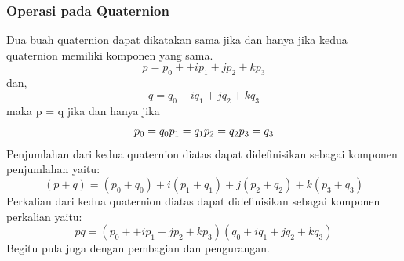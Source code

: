 \subsubsection{Operasi pada Quaternion}
Dua buah quaternion dapat dikatakan sama jika dan hanya jika kedua quaternion memiliki komponen yang sama.
\[
	p = p_0 + +ip_1+jp_2+kp_3
\]
dan,
\[
	q = q_0 + i q_1 + j q_2 + k q_3
\]
maka p = q jika dan hanya jika
\[
	p_0=q_0\\
	p_1=q_1\\
	p_2=q_2\\
	p_3=q_3\\
\]
Penjumlahan dari kedua quaternion diatas dapat didefinisikan sebagai komponen penjumlahan yaitu:
\[
	(p+q)=(p_0+q_0)+i(p_1+q_1)+j(p_2+q_2)+k(p_3+q_3)
\]
Perkalian dari kedua quaternion diatas dapat didefinisikan sebagai komponen perkalian yaitu:
\[
	pq = (p_0 + +ip_1+jp_2+kp_3)(q_0 + i q_1 + j q_2 + k q_3)
\]
Begitu pula juga dengan pembagian dan pengurangan.
